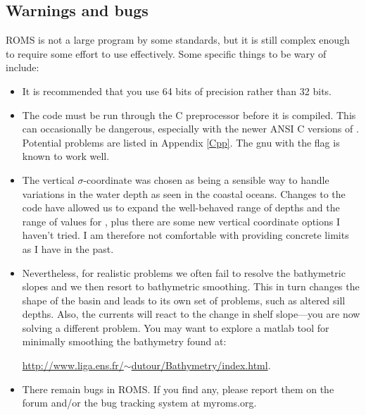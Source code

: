\subsection{Warnings and bugs}
ROMS is not a large program by some standards, but it is still complex
enough to require some effort to use effectively.
Some specific things to be wary of include:
\begin{itemize}
  \item It is recommended that you use 64 bits of precision rather
than 32 bits.
  \item The code must be run through the C preprocessor before it
is compiled.  This can occasionally be dangerous, especially with
the newer ANSI C versions of .  Potential problems are listed
in Appendix \ref{Cpp}. The gnu  with the  flag
is known to work well.
  \item The vertical $\sigma$-coordinate was chosen as being a sensible
way to handle variations in the water depth as seen in the coastal
oceans. Changes to the code have allowed us to expand the well-behaved
range of depths and the range of values for , plus
there are some new vertical coordinate options I haven't tried. I am
therefore not comfortable with providing concrete limits as I have in
the past.
  \item Nevertheless, for realistic problems we often fail to resolve the
bathymetric slopes and we then resort to bathymetric smoothing.
This in turn changes the shape of the basin and leads to its own set of
problems, such as altered sill depths. Also, the currents will react to
the change in shelf slope---you are now solving a different problem.
You may want to explore a matlab tool for minimally smoothing
the bathymetry found at:

\href{http://www.liga.ens.fr/~dutour/Bathymetry/index.html}{http://www.liga.ens.fr/$\sim$dutour/Bathymetry/index.html}.
  \item There remain bugs in ROMS. If you find any, please report
them on the forum and/or the bug tracking system at myroms.org.
\end{itemize}

